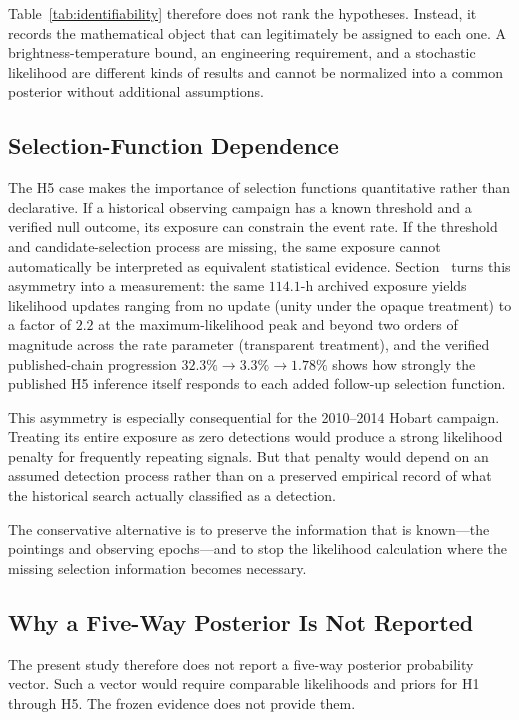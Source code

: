 \documentclass[twocolumn]{aastex701}
\begin{document}
Table~\ref{tab:identifiability} therefore does not rank the hypotheses. Instead, it records the mathematical object that can legitimately be assigned to each one. A brightness-temperature bound, an engineering requirement, and a stochastic likelihood are different kinds of results and cannot be normalized into a common posterior without additional assumptions.

\subsection{Selection-Function Dependence}

The H5 case makes the importance of selection functions quantitative rather than declarative. If a historical observing campaign has a known threshold and a verified null outcome, its exposure can constrain the event rate. If the threshold and candidate-selection process are missing, the same exposure cannot automatically be interpreted as equivalent statistical evidence. Section~ turns this asymmetry into a measurement: the same $114.1$-h archived exposure yields likelihood updates ranging from no update (unity under the opaque treatment) to a factor of $2.2$ at the maximum-likelihood peak and beyond two orders of magnitude across the rate parameter (transparent treatment), and the verified published-chain progression $32.3\%\rightarrow3.3\%\rightarrow1.78\%$ shows how strongly the published H5 inference itself responds to each added follow-up selection function.

This asymmetry is especially consequential for the 2010--2014 Hobart campaign. Treating its entire exposure as zero detections would produce a strong likelihood penalty for frequently repeating signals. But that penalty would depend on an assumed detection process rather than on a preserved empirical record of what the historical search actually classified as a detection.

The conservative alternative is to preserve the information that is known---the pointings and observing epochs---and to stop the likelihood calculation where the missing selection information becomes necessary.

\subsection{Why a Five-Way Posterior Is Not Reported}

The present study therefore does not report a five-way posterior probability vector. Such a vector would require comparable likelihoods and priors for H1 through H5. The frozen evidence does not provide them.
\end{document}
